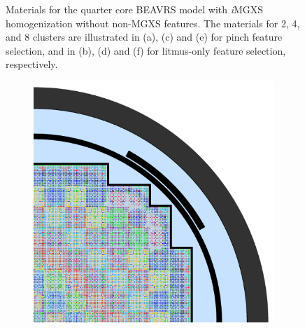 \begin{appendices}
\begin{figure}[h!]
\begin{subfigure}{0.48\textwidth}
  \caption{}
  \label{fig:no-features-full-core-combined-8}
\end{subfigure}
\caption[Clustered geometries without non-MGXS features]{Materials for the quarter core \ac{BEAVRS} model with \textit{i}\ac{MGXS} homogenization without non-\ac{MGXS} features. The materials for 2, 4, and 8 clusters are illustrated in (a), (c) and (e) for pinch feature selection, and in (b), (d) and (f) for litmus-only feature selection, respectively.}
\label{fig:no-features-full-core-geometries-8}
\end{figure}

\clearpage

\begin{figure}[h!]
\centering
\begin{subfigure}{0.48\textwidth}
  \centering
  \includegraphics[width=0.85\linewidth]{figures/unsupervised/geometries/without-features/16-clusters/pinch/full-core}
  \caption{}
  \label{fig:no-features-full-core-pinch-16}
\end{subfigure}%
\begin{subfigure}{0.48\textwidth}
  \centering

\end{subfigure}
\end{figure}
\end{appendices}
